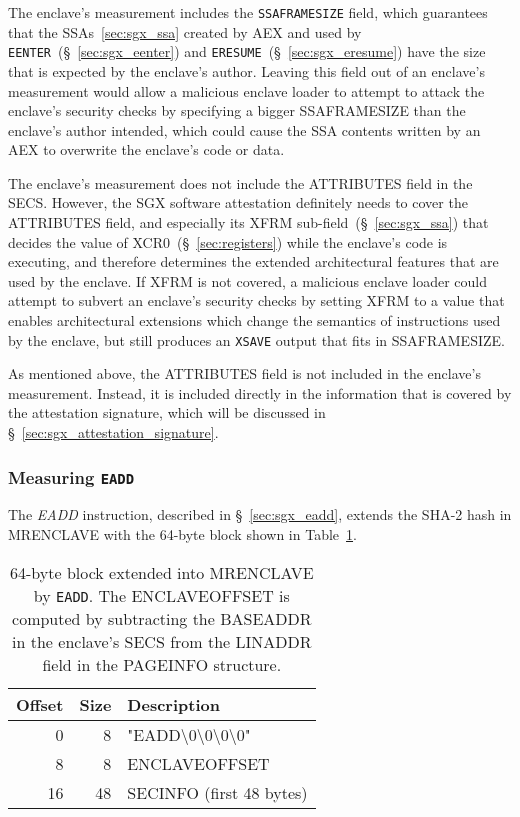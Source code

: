 The enclave's measurement includes the \texttt{SSAFRAMESIZE} field, which
guarantees that the SSAs~\ref{sec:sgx_ssa} created by AEX and used by
\texttt{EENTER}~(\S~\ref{sec:sgx_eenter}) and
\texttt{ERESUME}~(\S~\ref{sec:sgx_eresume}) have the size that is expected by
the enclave's author. Leaving this field out of an enclave's measurement would
allow a malicious enclave loader to attempt to attack the enclave's security
checks by specifying a bigger SSAFRAMESIZE than the enclave's author intended,
which could cause the SSA contents written by an AEX to overwrite the enclave's
code or data.

The enclave's measurement does not include the ATTRIBUTES field in the SECS.
However, the SGX software attestation definitely needs to cover the ATTRIBUTES
field, and especially its XFRM sub-field~(\S~\ref{sec:sgx_ssa}) that decides
the value of XCR0~(\S~\ref{sec:registers}) while the enclave's code is
executing, and therefore determines the extended architectural features that
are used by the enclave. If XFRM is not covered, a malicious enclave loader
could attempt to subvert an enclave's security checks by setting XFRM to a
value that enables architectural extensions which change the semantics of
instructions used by the enclave, but still produces an \texttt{XSAVE} output
that fits in SSAFRAMESIZE.

As mentioned above, the ATTRIBUTES field is not included in the enclave's
measurement. Instead, it is included directly in the information that is
covered by the attestation signature, which will be discussed in
\S~\ref{sec:sgx_attestation_signature}.


\subsubsection{Measuring \texttt{EADD}}
\label{sec:sgx_eadd_mrenclave}


The \textit{EADD} instruction, described in \S~\ref{sec:sgx_eadd}, extends the
SHA-2 hash in MRENCLAVE with the 64-byte block shown in
Table~\ref{fig:eadd_mrenclave}.

\begin{table}[hbt]
  \centering
  \begin{tabularx}{\columnwidth}{| r | r | X |}
  \hline
  \textbf{Offset} & \textbf{Size} & \textbf{Description}\\
  \hline
  0 & 8 &
  "EADD\textbackslash{}0\textbackslash{}0\textbackslash{}0\textbackslash{}0" \\
  \hline
  8 & 8 & ENCLAVEOFFSET \\
  \hline
  16 & 48 & SECINFO (first 48 bytes) \\
  \hline
  \end{tabularx}
  \caption{
    64-byte block extended into MRENCLAVE by \texttt{EADD}. The ENCLAVEOFFSET
    is computed by subtracting the BASEADDR in the enclave's SECS from the
    LINADDR field in the PAGEINFO structure.
  }
  \label{fig:eadd_mrenclave}
\end{table}

